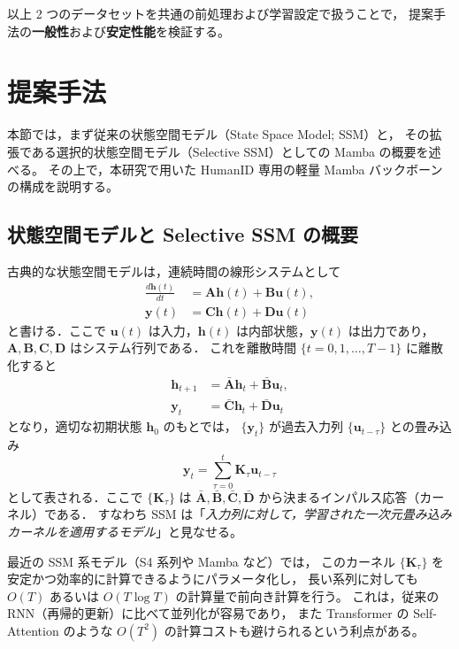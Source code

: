 \documentclass[11pt]{ltjsarticle}
\begin{document}
\noindent
以上 2 つのデータセットを共通の前処理および学習設定で扱うことで，
提案手法の\textbf{一般性}および\textbf{安定性能}を検証する。



\section{提案手法}

本節では，まず従来の状態空間モデル（State Space Model; SSM）と，
その拡張である選択的状態空間モデル（Selective SSM）としての Mamba の概要を述べる。
その上で，本研究で用いた HumanID 専用の軽量 Mamba バックボーンの構成を説明する。

\subsection{状態空間モデルと Selective SSM の概要}

古典的な状態空間モデルは，連続時間の線形システムとして
\begin{align}
  \frac{d\mathbf{h}(t)}{dt} &= \mathbf{A}\mathbf{h}(t) + \mathbf{B}\mathbf{u}(t),\\
  \mathbf{y}(t) &= \mathbf{C}\mathbf{h}(t) + \mathbf{D}\mathbf{u}(t)
\end{align}
と書ける．ここで $\mathbf{u}(t)$ は入力，$\mathbf{h}(t)$ は内部状態，$\mathbf{y}(t)$ は出力であり，
$\mathbf{A},\mathbf{B},\mathbf{C},\mathbf{D}$ はシステム行列である．
これを離散時間 $\{t=0,1,\dots,T-1\}$ に離散化すると
\begin{align}
  \mathbf{h}_{t+1} &= \bar{\mathbf{A}} \mathbf{h}_{t} + \bar{\mathbf{B}} \mathbf{u}_{t},\\
  \mathbf{y}_{t}   &= \bar{\mathbf{C}} \mathbf{h}_{t} + \bar{\mathbf{D}} \mathbf{u}_{t}
\end{align}
となり，適切な初期状態 $\mathbf{h}_0$ のもとでは，
$\{\mathbf{y}_t\}$ が過去入力列 $\{\mathbf{u}_{t-\tau}\}$ との畳み込み
\begin{equation}
  \mathbf{y}_t = \sum_{\tau=0}^{t} \mathbf{K}_\tau \mathbf{u}_{t-\tau}
\end{equation}
として表される．ここで $\{\mathbf{K}_\tau\}$ は
$\bar{\mathbf{A}},\bar{\mathbf{B}},\bar{\mathbf{C}},\bar{\mathbf{D}}$ から決まるインパルス応答（カーネル）である．
すなわち SSM は「\emph{入力列に対して，学習された一次元畳み込みカーネルを適用するモデル}」と見なせる。

最近の SSM 系モデル（S4 系列や Mamba など）では，
このカーネル $\{\mathbf{K}_\tau\}$ を安定かつ効率的に計算できるようにパラメータ化し，
長い系列に対しても $O(T)$ あるいは $O(T \log T)$ の計算量で前向き計算を行う。
これは，従来の RNN（再帰的更新）に比べて並列化が容易であり，
また Transformer の Self-Attention のような $O(T^2)$ の計算コストも避けられるという利点がある。
\end{document}
